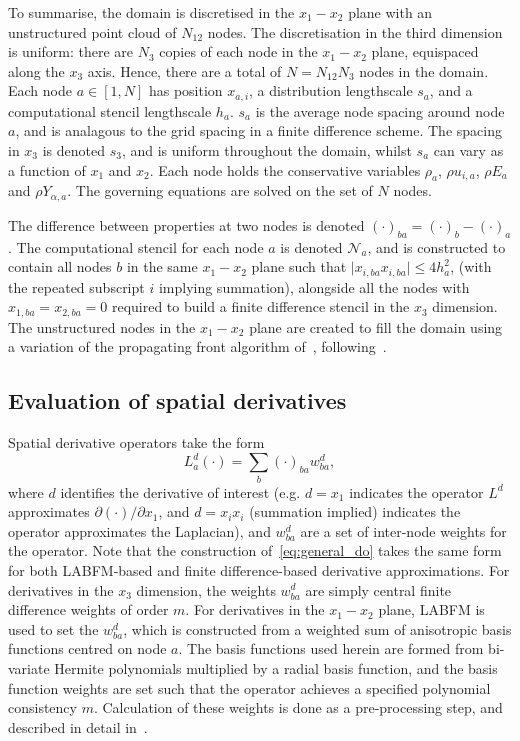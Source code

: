 \documentclass[notitlepage]{revtex4-1}
\begin{document}
To summarise, the domain is discretised in the $x_{1}-x_{2}$ plane with an unstructured point cloud of $N_{12}$ nodes. The discretisation in the third dimension is uniform: there are $N_{3}$ copies of each node in the $x_{1}-x_{2}$ plane, equispaced along the $x_{3}$ axis. Hence, there are a total of $N=N_{12}N_{3}$ nodes in the domain. Each node $a\in\left[1,N\right]$ has position $x_{a,i}$, a distribution lengthscale $s_{a}$, and a computational stencil lengthscale $h_{a}$. $s_{a}$ is the average node spacing around node $a$, and is analagous to the grid spacing in a finite difference scheme. The spacing in $x_{3}$ is denoted $s_{3}$, and is uniform throughout the domain, whilst $s_{a}$ can vary as a function of $x_{1}$ and $x_{2}$. Each node holds the conservative variables $\rho_{a}$, $\rho{u}_{i,a}$, $\rho{E}_{a}$ and $\rho{Y}_{\alpha,a}$. The governing equations are solved on the set of $N$ nodes. 

The difference between properties at two nodes is denoted $\left(\cdot\right)_{ba}=\left(\cdot\right)_{b}-\left(\cdot\right)_{a}$. The computational stencil for each node $a$ is denoted $\mathcal{N}_{a}$, and is constructed to contain all nodes $b$ in the same $x_{1}-x_{2}$ plane such that $\lvert{x}_{i,ba}x_{i,ba}\rvert\le4h_{a}^{2}$, (with the repeated subscript $i$ implying summation), alongside all the nodes with $x_{1,ba}=x_{2,ba}=0$ required to build a finite difference stencil in the $x_{3}$ dimension. The unstructured nodes in the $x_{1}-x_{2}$ plane are created to fill the domain using a variation of the propagating front algorithm of~\cite{fornberg_2015a}, following~\cite{king_2022}.

\subsection{Evaluation of spatial derivatives}

Spatial derivative operators take the form
\begin{equation}L^{d}_{a}\left(\cdot\right)=\displaystyle\sum_{b}\left(\cdot\right)_{ba}w^{d}_{ba},\label{eq:general_do}\end{equation}
where $d$ identifies the derivative of interest (e.g. $d=x_{1}$ indicates the operator $L^{d}$ approximates $\partial\left(\cdot\right)/\partial{x}_{1}$, and $d=x_{i}x_{i}$ (summation implied) indicates the operator approximates the Laplacian), and $w^{d}_{ba}$ are a set of inter-node weights for the operator. Note that the construction of~\eqref{eq:general_do} takes the same form for both LABFM-based and finite difference-based derivative approximations. For derivatives in the $x_{3}$ dimension, the weights $w^{d}_{ba}$ are simply central finite difference weights of order $m$. For derivatives in the $x_{1}-x_{2}$ plane, LABFM is used to set the $w^{d}_{ba}$, which is constructed from a weighted sum of anisotropic basis functions centred on node $a$. The basis functions used herein are formed from bi-variate Hermite polynomials multiplied by a radial basis function, and the basis function weights are set such that the operator achieves a specified polynomial consistency $m$. Calculation of these weights is done as a pre-processing step, and described in detail in~\cite{king_2022}. 
\end{document}
